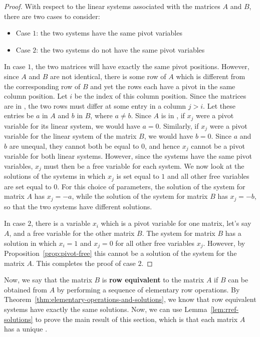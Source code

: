 \begin{proof}
  With respect to the linear systems associated with the matrices $A$ and $B$, there are two cases to consider:
  \begin{itemize}
  \item Case $1$: the two systems have the same pivot variables
  \item Case $2$: the two systems do not have the same pivot variables
  \end{itemize}
  In case $1$, the two matrices will have exactly the same pivot
  positions. However, since $A$ and $B$ are not identical, there is
  some row of $A$ which is different from the corresponding row of $B$
  and yet the rows each have a pivot in the same column position. Let
  $i$ be the index of this column position. Since the matrices are in
  {\rref}, the two rows must differ at some entry in a column
  $j>i$. Let these entries be $a$ in $A$ and $b$ in $B$, where
  $a \neq b$. Since $A$ is in {\rref}, if $x_j$ were a pivot variable
  for its linear system, we would have $a=0$. Similarly, if $x_j$ were
  a pivot variable for the linear system of the matrix $B$, we would
  have $b=0$. Since $a$ and $b$ are unequal, they cannot both be equal
  to $0$, and hence $x_j$ cannot be a pivot variable for both linear
  systems. However, since the systems have the same pivot variables,
  $x_j$ must then be a free variable for each system. We now look at
  the solutions of the systems in which $x_j$ is set equal to $1$ and
  all other free variables are set equal to $0$. For this choice of
  parameters, the solution of the system for matrix $A$ has $x_j=-a$,
  while the solution of the system for matrix $B$ has $x_j=-b$, so
  that the two systems have different solutions.

  In case $2$, there is a variable $x_i$ which is a pivot variable for
  one matrix, let's say $A$, and a free variable for the other matrix
  $B$. The system for matrix $B$ has a solution in which $x_i=1$ and
  $x_j=0$ for all other free variables $x_j$. However, by
  Proposition~\ref{prop:pivot-free} this cannot be a solution of the
  system for the matrix $A$. This completes the proof of case $2$.
\end{proof}

Now, we say that the matrix $B$ is \textbf{row equivalent}%
%
%
to the matrix $A$ if $B$ can be obtained from
$A$ by performing a sequence of elementary row operations. By
Theorem~\ref{thm:elementary-operations-and-solutions}, we know that row
equivalent systems have exactly the same solutions. Now, we can use
Lemma~\ref{lem:rref-solutions} to prove the main result of this
section, which is that each matrix $A$ has a unique {\rref}.

